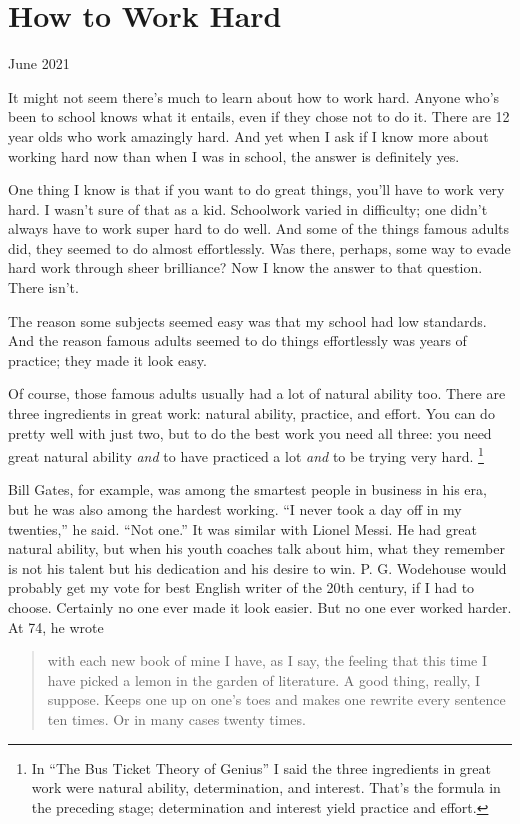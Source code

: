 \chapter{How to Work Hard}

June 2021

It might not seem there's much to learn about how to work hard. Anyone
who's been to school knows what it entails, even if they chose not to do
it. There are 12 year olds who work amazingly hard. And yet when I ask
if I know more about working hard now than when I was in school, the
answer is definitely yes.

One thing I know is that if you want to do great things, you'll have to
work very hard. I wasn't sure of that as a kid. Schoolwork varied in
difficulty; one didn't always have to work super hard to do well. And
some of the things famous adults did, they seemed to do almost
effortlessly. Was there, perhaps, some way to evade hard work through
sheer brilliance? Now I know the answer to that question. There isn't.

The reason some subjects seemed easy was that my school had low
standards. And the reason famous adults seemed to do things effortlessly
was years of practice; they made it look easy.

Of course, those famous adults usually had a lot of natural ability too.
There are three ingredients in great work: natural ability, practice,
and effort. You can do pretty well with just two, but to do the best
work you need all three: you need great natural ability \emph{and} to
have practiced a lot \emph{and} to be trying very hard.
\footnote{In ``The Bus Ticket Theory of Genius'' I said the three
ingredients in great work were natural ability, determination, and
interest. That's the formula in the preceding stage; determination and
interest yield practice and effort.}

Bill Gates, for example, was among the smartest people in business in
his era, but he was also among the hardest working. ``I never took a day
off in my twenties,'' he said. ``Not one.'' It was similar with Lionel
Messi. He had great natural ability, but when his youth coaches talk
about him, what they remember is not his talent but his dedication and
his desire to win. P. G. Wodehouse would probably get my vote for best
English writer of the 20th century, if I had to choose. Certainly no one
ever made it look easier. But no one ever worked harder. At 74, he wrote

\begin{quote}
with each new book of mine I have, as I say, the feeling that this time
I have picked a lemon in the garden of literature. A good thing, really,
I suppose. Keeps one up on one's toes and makes one rewrite every
sentence ten times. Or in many cases twenty times.
\end{quote}

